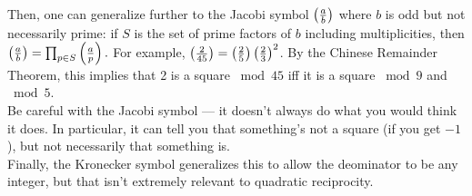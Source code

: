 \label{qr}
Then, one can generalize further to the Jacobi symbol $\left(\frac{a}{b}\right)$ where $b$ is odd but not necessarily prime: if $S$ is the set of prime factors of $b$ including multiplicities, then
$\left(\frac{a}{b}\right) = \prod_{p\in S}\left(\frac{a}{p}\right).$
For example, $\left(\frac{2}{45}\right) = \left(\frac{2}{5}\right)\left(\frac{2}{3}\right)^2$. By the Chinese Remainder Theorem, this implies that 2 is a square $\bmod 45$ iff it is a square $\bmod 9$ and $\bmod 5$.\\
Be careful with the Jacobi symbol --- it doesn't always do what you would think it does. In particular, it can tell you that something's not a square (if you get $-1$), but not necessarily that something is.\\
Finally, the Kronecker symbol generalizes this to allow the deominator to be any integer, but that isn't extremely relevant to quadratic reciprocity.
%
